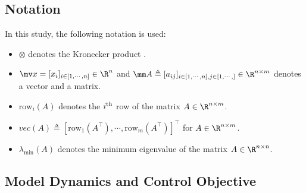 \documentclass[lettersize,journal]{IEEEtran}
\begin{document}
\subsection{Notation}
In this study, the following notation is used:

\begin{itemize}
    \item $\otimes$ denotes the Kronecker product \cite{RN17}.
    \item $\mv x=[x_i]_{i\in[1,\cdots,n]}\in\R^n$ and $\mm A\triangleq [a_{ij}]_{i\in[1,\cdots,n],j\in[1,\cdots ,]}\in\R^{n\times m}$ denotes a vector and a matrix.
    \item $\text{row}_i(A)$ denotes the $i\textsuperscript{th}$ row of the matrix $A\in\R^{n\times m}$. 
    \item $\textit{vec}(A)\triangleq [\text{row}_1(A^\top)  ,\cdots,\text{row}_m(A^\top)  ]^\top   $ for $A\in\R^{n\times m}$.
    \item $\lambda_\text{min}(A)$ denotes the minimum eigenvalue of the matrix $A\in\R^{n\times n}$.
\end{itemize}

\subsection{Model Dynamics and Control Objective}
\end{document}
